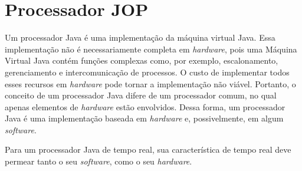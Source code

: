 \documentclass[10pt,twocolumn]{article}
\begin{document}
\section {Processador JOP}
	Um processador {J}ava é uma implementação da máquina virtual {J}ava. Essa implementação não é necessariamente completa em \emph{hardware}, pois uma Máquina Virtual {J}ava contém funções complexas como, por exemplo, escalonamento, gerenciamento e intercomunicação de processos. O custo de implementar todos esses recursos em \emph{hardware} pode tornar a implementação não viável. Portanto, o conceito de um processador {J}ava difere de um processador comum, no qual apenas elementos de \emph{hardware} estão envolvidos. Dessa forma, um processador {J}ava é uma implementação baseada em \emph{hardware} e, possivelmente, em algum \emph{software}.

	Para um processador {J}ava de tempo real, sua característica de tempo real deve permear tanto o seu \emph{software}, como o seu \emph{hardware}.
\end{document}
